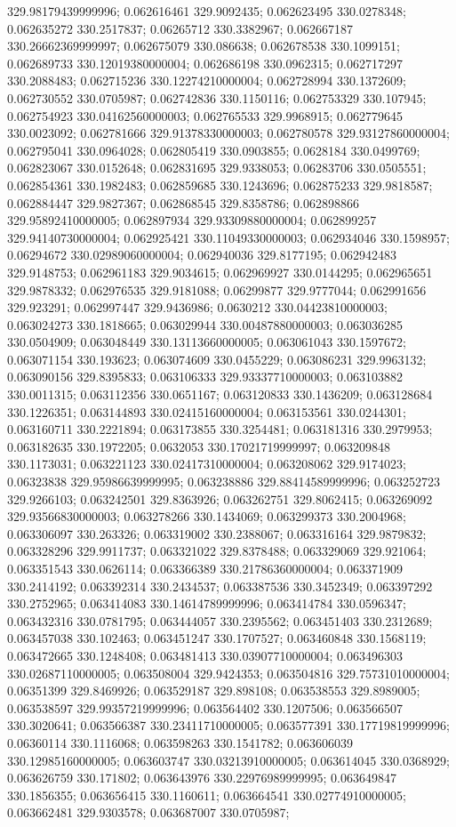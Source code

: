 329.98179439999996; 0.062616461 329.9092435; 0.062623495 330.0278348; 0.062635272 330.2517837; 0.06265712 330.3382967; 0.062667187 330.26662369999997; 0.062675079 330.086638; 0.062678538 330.1099151; 0.062689733 330.12019380000004; 0.062686198 330.0962315; 0.062717297 330.2088483; 0.062715236 330.12274210000004; 0.062728994 330.1372609; 0.062730552 330.0705987; 0.062742836 330.1150116; 0.062753329 330.107945; 0.062754923 330.04162560000003; 0.062765533 329.9968915; 0.062779645 330.0023092; 0.062781666 329.91378330000003; 0.062780578 329.93127860000004; 0.062795041 330.0964028; 0.062805419 330.0903855; 0.0628184 330.0499769; 0.062823067 330.0152648; 0.062831695 329.9338053; 0.06283706 330.0505551; 0.062854361 330.1982483; 0.062859685 330.1243696; 0.062875233 329.9818587; 0.062884447 329.9827367; 0.062868545 329.8358786; 0.062898866 329.95892410000005; 0.062897934 329.93309880000004; 0.062899257 329.94140730000004; 0.062925421 330.11049330000003; 0.062934046 330.1598957; 0.06294672 330.02989060000004; 0.062940036 329.8177195; 0.062942483 329.9148753; 0.062961183 329.9034615; 0.062969927 330.0144295; 0.062965651 329.9878332; 0.062976535 329.9181088; 0.06299877 329.9777044; 0.062991656 329.923291; 0.062997447 329.9436986; 0.0630212 330.04423810000003; 0.063024273 330.1818665; 0.063029944 330.00487880000003; 0.063036285 330.0504909; 0.063048449 330.13113660000005; 0.063061043 330.1597672; 0.063071154 330.193623; 0.063074609 330.0455229; 0.063086231 329.9963132; 0.063090156 329.8395833; 0.063106333 329.93337710000003; 0.063103882 330.0011315; 0.063112356 330.0651167; 0.063120833 330.1436209; 0.063128684 330.1226351; 0.063144893 330.02415160000004; 0.063153561 330.0244301; 0.063160711 330.2221894; 0.063173855 330.3254481; 0.063181316 330.2979953; 0.063182635 330.1972205; 0.0632053 330.17021719999997; 0.063209848 330.1173031; 0.063221123 330.02417310000004; 0.063208062 329.9174023; 0.06323838 329.95986639999995; 0.063238886 329.88414589999996; 0.063252723 329.9266103; 0.063242501 329.8363926; 0.063262751 329.8062415; 0.063269092 329.93566830000003; 0.063278266 330.1434069; 0.063299373 330.2004968; 0.063306097 330.263326; 0.063319002 330.2388067; 0.063316164 329.9879832; 0.063328296 329.9911737; 0.063321022 329.8378488; 0.063329069 329.921064; 0.063351543 330.0626114; 0.063366389 330.21786360000004; 0.063371909 330.2414192; 0.063392314 330.2434537; 0.063387536 330.3452349; 0.063397292 330.2752965; 0.063414083 330.14614789999996; 0.063414784 330.0596347; 0.063432316 330.0781795; 0.063444057 330.2395562; 0.063451403 330.2312689; 0.063457038 330.102463; 0.063451247 330.1707527; 0.063460848 330.1568119; 0.063472665 330.1248408; 0.063481413 330.03907710000004; 0.063496303 330.02687110000005; 0.063508004 329.9424353; 0.063504816 329.75731010000004; 0.06351399 329.8469926; 0.063529187 329.898108; 0.063538553 329.8989005; 0.063538597 329.99357219999996; 0.063564402 330.1207506; 0.063566507 330.3020641; 0.063566387 330.23411710000005; 0.063577391 330.17719819999996; 0.06360114 330.1116068; 0.063598263 330.1541782; 0.063606039 330.12985160000005; 0.063603747 330.03213910000005; 0.063614045 330.0368929; 0.063626759 330.171802; 0.063643976 330.22976989999995; 0.063649847 330.1856355; 0.063656415 330.1160611; 0.063664541 330.02774910000005; 0.063662481 329.9303578; 0.063687007 330.0705987; 